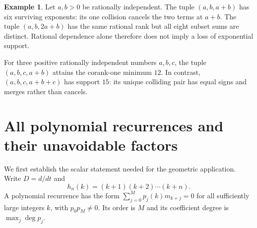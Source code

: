 \documentclass[11pt]{article}
\theoremstyle{definition}
\newtheorem{example}[theorem]{Example}
\theoremstyle{remark}
\numberwithin{equation}{section}
\begin{document}
\begin{example}
Let $a,b>0$ be rationally independent. The tuple $(a,b,a+b)$ has
six surviving exponents: its one collision cancels the two terms at
$a+b$. The tuple $(a,b,2a+b)$ has the same rational rank but all eight
subset sums are distinct. Rational dependence alone therefore does not
imply a loss of exponential support.

For three positive rationally independent numbers $a,b,c$, the tuple
$(a,b,c,a+b)$ attains the corank-one minimum $12$. In contrast,
$(a,b,c,a+b+c)$ has support $15$: its unique colliding pair has equal
signs and merges rather than cancels.
\end{example}


\section{All polynomial recurrences and their unavoidable factors}
\label{sec:symplectic}

We first establish the scalar statement needed for the geometric
application. Write $D=d/dt$ and
\[
 h_n(k)=(k+1)(k+2)\cdots(k+n).
\]
A polynomial recurrence has the form $\sum_{j=0}^M p_j(k)m_{k+j}=0$
for all sufficiently large integers $k$, with $p_0p_M\ne0$. Its
order is $M$ and its coefficient degree is $\max_j\deg p_j$.
\end{document}
